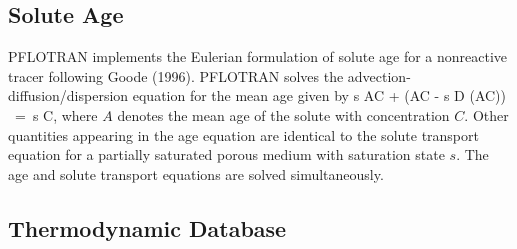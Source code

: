 \documentclass[12pt]{article}
\def\EQ#1\EN{\begin{equation}#1\end{equation}}
\newcommand{\eq}{\ =\ }
\newcommand{\p}{{\partial}}
\newcommand{\bnabla}{\boldsymbol{\nabla}}
\newcommand{\bq}{\boldsymbol{q}}
\begin{document}
\subsection{Solute Age}

PFLOTRAN implements the Eulerian formulation of solute age for a nonreactive tracer following Goode (1996). PFLOTRAN solves the advection-diffusion/dispersion equation for the mean age given by
\EQ
\frac{\p}{\p t} \varphi s AC + \bnabla\cdot\Big(\bq AC - \varphi s D \bnabla (AC)\Big) \eq \varphi s C,
\EN
where $A$ denotes the mean age of the solute with concentration $C$. Other quantities appearing in the age equation are identical to the solute transport equation for a partially saturated porous medium with saturation state $s$. The age and solute transport equations are solved simultaneously.


\subsection{Thermodynamic Database}
\end{document}
